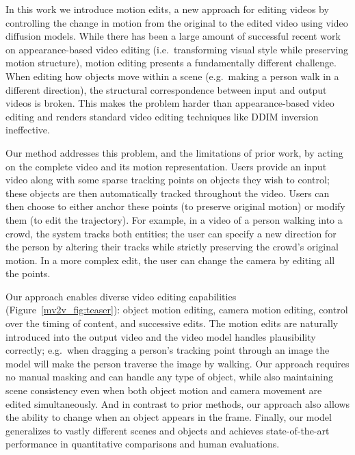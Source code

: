 In this work we introduce motion edits, a new approach for editing videos by controlling the change in motion from the original to the edited video using video diffusion models. While there has been a large amount of successful recent work on appearance-based video editing (i.e.\ transforming visual style while preserving motion structure), motion editing presents a fundamentally different challenge. When editing how objects move within a scene (e.g.\ making a person walk in a different direction), the structural correspondence between input and output videos is broken. This makes the problem harder than appearance-based video editing and renders standard video editing techniques like DDIM inversion ineffective.

Our method addresses this problem, and the limitations of prior work, by acting on the complete video and its motion representation. Users provide an input video along with some sparse tracking points on objects they wish to control; these objects are then automatically tracked throughout the video. Users can then choose to either anchor these points (to preserve original motion) or modify them (to edit the trajectory). For example, in a video of a person walking into a crowd, the system tracks both entities; the user can specify a new direction for the person by altering their tracks while strictly preserving the crowd's original motion. In a more complex edit, the user can change the camera by editing all the points.

Our approach enables diverse video editing capabilities (Figure~\ref{mv2v_fig:teaser}): object motion editing, camera motion editing, control over the timing of content, and successive edits. The motion edits are naturally introduced into the output video and the video model handles plausibility correctly; e.g.\ when dragging a person's tracking point through an image the model will make the person traverse the image by walking. Our approach requires no manual masking and can handle any type of object, while also maintaining scene consistency even when both object motion and camera movement are edited simultaneously. And in contrast to prior methods, our approach also allows the ability to change when an object appears in the frame. Finally, our model generalizes to vastly different scenes and objects and achieves state-of-the-art performance in quantitative comparisons and human evaluations.


